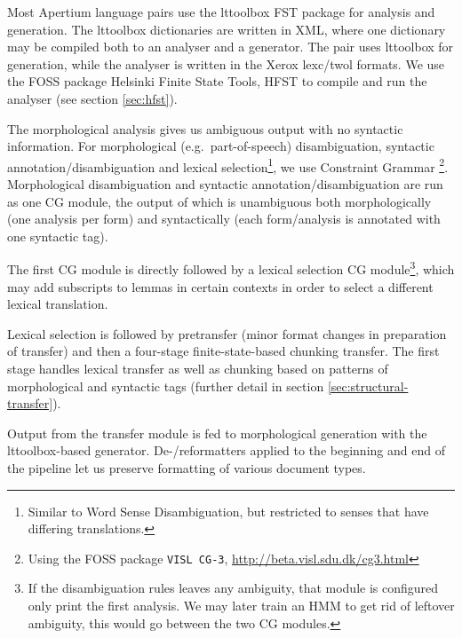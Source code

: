 Most Apertium language pairs use the lttoolbox FST package for
analysis and generation. The lttoolbox dictionaries are written in
XML, where one dictionary may be compiled both to an analyser and a
generator. The \smenob{} pair uses lttoolbox for \nob{}
generation, while the \sme{} analyser is written in the Xerox lexc/twol
formats\citep{beesley2003fsm}. We use the FOSS package Helsinki Finite
State Tools, HFST \citep{linden2011hfst} to compile and run the
analyser (see section \ref{sec:hfst}).

The morphological analysis gives us ambiguous output with no syntactic
information. For morphological (e.g.~part-of-speech) disambiguation,
syntactic annotation/disambiguation and lexical
selection\footnote{Similar to Word Sense Disambiguation, but
  restricted to senses that have differing translations.}, we use
Constraint Grammar \citep{karlsson1990cgf}\footnote{Using the FOSS
  package {\tt \small VISL CG-3},
  \href{http://beta.visl.sdu.dk/cg3.html}{http://beta.visl.sdu.dk/cg3.html}}.
Morphological disambiguation and syntactic annotation/disambiguation
are run as one CG module, the output of which is unambiguous both
morphologically (one analysis per form) and syntactically (each
form/analysis is annotated with one syntactic tag).

The first CG module is directly followed by a lexical selection CG
module\footnote{If the disambiguation rules leaves any ambiguity, that
  module is configured only print the first analysis. We may later
  train an HMM to get rid of leftover ambiguity, this would go between
  the two CG modules.}, which may add subscripts to lemmas in certain
contexts in order to select a different lexical translation. 

Lexical selection is followed by pretransfer (minor format changes in
preparation of transfer) and then a four-stage finite-state-based
chunking transfer. The first stage handles lexical transfer as well as
chunking based on patterns of morphological and syntactic tags
(further detail in section \ref{sec:structural-transfer}).

Output from the transfer module is fed to morphological generation
with the lttoolbox-based \nob{} generator. De-/reformatters applied to
the beginning and end of the pipeline let us preserve formatting of
various document types.

